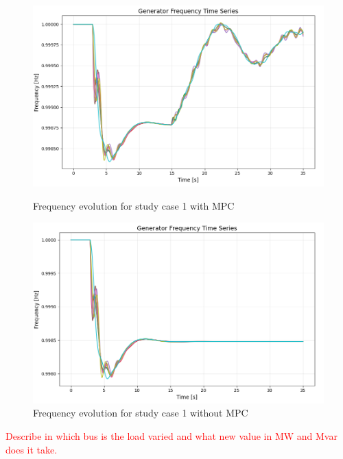 \documentclass{article}
\begin{document}
\begin{figure}[ht]
    \centering
    \begin{minipage}{0.45\textwidth}
        \centering
        \includegraphics[width=\textwidth]{figures/mpc_load.png}
        \caption{Frequency evolution for study case 1 with MPC}
        \label{fig:frequency_response_1}
    \end{minipage}%
    \hspace{0.1cm}  %
    \begin{minipage}{0.45\textwidth}
        \centering
        \includegraphics[width=\textwidth]{figures/non_mpc_load.png}
        \caption{Frequency evolution for study case 1 without MPC}
        \label{fig:frequency_response_2}
    \end{minipage}
\end{figure}

\textcolor{red}{Describe in which bus is the load varied and what new value in MW and Mvar does it take.}
\end{document}

